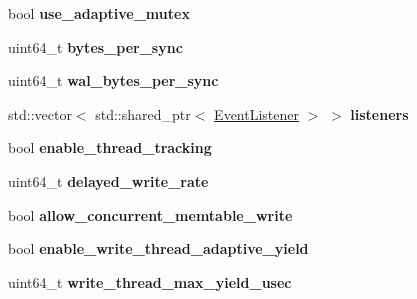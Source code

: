 \begin{DoxyCompactItemize}
\item 
bool {\bfseries use\+\_\+adaptive\+\_\+mutex}\hypertarget{structrocksdb_1_1DBOptions_ad9819f8645d0529285b0845545cd9286}{}\label{structrocksdb_1_1DBOptions_ad9819f8645d0529285b0845545cd9286}

\item 
uint64\+\_\+t {\bfseries bytes\+\_\+per\+\_\+sync}\hypertarget{structrocksdb_1_1DBOptions_a906e2c4dc27261d6c38761b32fc327bc}{}\label{structrocksdb_1_1DBOptions_a906e2c4dc27261d6c38761b32fc327bc}

\item 
uint64\+\_\+t {\bfseries wal\+\_\+bytes\+\_\+per\+\_\+sync}\hypertarget{structrocksdb_1_1DBOptions_a651aad787c4a3692e504720f46a560ed}{}\label{structrocksdb_1_1DBOptions_a651aad787c4a3692e504720f46a560ed}

\item 
std\+::vector$<$ std\+::shared\+\_\+ptr$<$ \hyperlink{classrocksdb_1_1EventListener}{Event\+Listener} $>$ $>$ {\bfseries listeners}\hypertarget{structrocksdb_1_1DBOptions_a181c95f50c27dc35683e51dfdbe6fb23}{}\label{structrocksdb_1_1DBOptions_a181c95f50c27dc35683e51dfdbe6fb23}

\item 
bool {\bfseries enable\+\_\+thread\+\_\+tracking}\hypertarget{structrocksdb_1_1DBOptions_a363866053585683ad59e218da91da55b}{}\label{structrocksdb_1_1DBOptions_a363866053585683ad59e218da91da55b}

\item 
uint64\+\_\+t {\bfseries delayed\+\_\+write\+\_\+rate}\hypertarget{structrocksdb_1_1DBOptions_a0be34d0f483e371cfdfd5eacb916e3d9}{}\label{structrocksdb_1_1DBOptions_a0be34d0f483e371cfdfd5eacb916e3d9}

\item 
bool {\bfseries allow\+\_\+concurrent\+\_\+memtable\+\_\+write}\hypertarget{structrocksdb_1_1DBOptions_ae2ae762f46b856a815e852d7ba296a59}{}\label{structrocksdb_1_1DBOptions_ae2ae762f46b856a815e852d7ba296a59}

\item 
bool {\bfseries enable\+\_\+write\+\_\+thread\+\_\+adaptive\+\_\+yield}\hypertarget{structrocksdb_1_1DBOptions_aeb3dc073acbd119db542100a9f3666b5}{}\label{structrocksdb_1_1DBOptions_aeb3dc073acbd119db542100a9f3666b5}

\item 
uint64\+\_\+t {\bfseries write\+\_\+thread\+\_\+max\+\_\+yield\+\_\+usec}\hypertarget{structrocksdb_1_1DBOptions_ab1d40797f52ec7ad0a822af8559833ce}{}\label{structrocksdb_1_1DBOptions_ab1d40797f52ec7ad0a822af8559833ce}


\end{DoxyCompactItemize}
